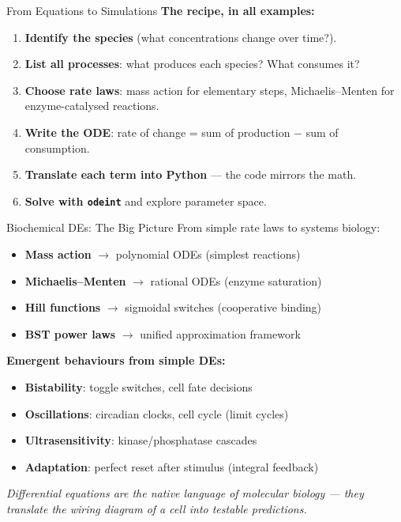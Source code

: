 \begin{frame}{From Equations to Simulations}
\textbf{The recipe, in all examples:}

\vspace{0.3cm}
\begin{enumerate}
    \item \textbf{Identify the species} (what concentrations change over time?).
    \item \textbf{List all processes}: what produces each species? What consumes it?
    \item \textbf{Choose rate laws}: mass action for elementary steps, Michaelis--Menten for enzyme-catalysed reactions.
    \item \textbf{Write the ODE}: rate of change = sum of production $-$ sum of consumption.
    \item \textbf{Translate each term into Python} --- the code mirrors the math.
    \item \textbf{Solve with \texttt{odeint}} and explore parameter space.
\end{enumerate}

\end{frame}


\begin{frame}{Biochemical DEs: The Big Picture}
From simple rate laws to systems biology:

\vspace{0.3cm}
\begin{itemize}
    \item \textbf{Mass action} $\to$ polynomial ODEs (simplest reactions)
    \item \textbf{Michaelis--Menten} $\to$ rational ODEs (enzyme saturation)
    \item \textbf{Hill functions} $\to$ sigmoidal switches (cooperative binding)
    \item \textbf{BST power laws} $\to$ unified approximation framework
\end{itemize}

\vspace{0.3cm}
\textbf{Emergent behaviours from simple DEs:}
\begin{itemize}
    \item \textbf{Bistability}: toggle switches, cell fate decisions
    \item \textbf{Oscillations}: circadian clocks, cell cycle (limit cycles)
    \item \textbf{Ultrasensitivity}: kinase/phosphatase cascades
    \item \textbf{Adaptation}: perfect reset after stimulus (integral feedback)
\end{itemize}

\vspace{0.3cm}
\textit{Differential equations are the native language of molecular biology --- they translate the wiring diagram of a cell into testable predictions.}
\end{frame}

